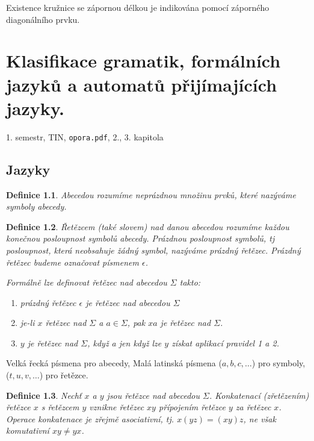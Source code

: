 \documentclass[a4paper, 11pt]{report}
\newtheorem{mydef}{Definice}[chapter]
\begin{document}
Existence kružnice se zápornou délkou je indikována pomocí záporného diagonálního prvku.





\chapter{Klasifikace gramatik, formálních jazyků a automatů přijímajících jazyky.} \label{cha:16}

1. semestr, TIN, \texttt{opora.pdf}, 2., 3. kapitola

\section{Jazyky}
\begin{mydef}
Abecedou rozumíme neprázdnou množinu prvků, které nazýváme \emph{symboly abecedy}.
\end{mydef}

\begin{mydef}
\emph{Řetězcem} (také slovem) nad danou abecedou rozumíme každou konečnou posloupnost symbolů abecedy. Prázdnou posloupnost symbolů, tj posloupnost, která neobsahuje žádný symbol, nazýváme \emph{prázdný řetězec}. Prázdný řetězec budeme označovat písmenem $\epsilon$.

Formálně lze definovat řetězec nad abecedou $\Sigma$ takto:
\begin{enumerate}[(1)]
	\item prázdný řetězec $\epsilon$ je řetězec nad abecedou $\Sigma$
	\item je-li $x$ řetězec nad $\Sigma$ a $a \in \Sigma$, pak $xa$ je řetězec nad $\Sigma$.
	\item $y$ je řetězec nad $\Sigma$, když a jen když lze $y$ získat aplikací pravidel 1 a 2.
\end{enumerate}
\end{mydef}

Velká řecká písmena pro abecedy, Malá latinská písmena ($a, b, c, \dots$) pro symboly, ($t, u, v, \dots$) pro řetězce.

\begin{mydef}
Nechť $x$ a $y$ jsou řetězce nad abecedou $\Sigma$. \emph{Konkatenací} (zřetězením) řetězce $x$ s řetězcem $y$ vznikne řetězec $xy$ přípojením řetězce $y$ za řetězec $x$. Operace konkatenace je zřejmě asociativní, tj. $x(yz) = (xy)z$, ne však komutativní $xy \not= yx$.
\end{mydef}
\end{document}
